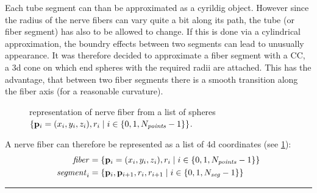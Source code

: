 Each tube segment can than be approximated as a cyrildig object.
However since the radius of the nerve fibers can vary quite a bit along its path, the tube (or fiber segment) has also to be allowed to change.
If this is done via a cylindrical approximation, the boundry effects between two segments can lead to unusually appearance.
It was therefore decided to approximate a fiber segment with a \ac{CC}, a 3d cone on which end spheres with the required radii are attached.
This has the advantage, that between two fiber segments there is a smooth transition along the fiber axis (for a reasonable curvature).
% 
\begin{figure}[!t]
    \def\tikzwidth{0.85\textwidth}
    \centering
	\caption[]{representation of nerve fiber from a list of spheres $\left\{ \mathbf{p}_i=(x_i,y_i,z_i), r_i \mid i \in \{0,1,N_{\mathit{points}}-1\}\right\}$.}
	\label{fig:fiberReb}
\end{figure}
% 
A nerve fiber can therefore be represented as a list of 4d coordinates (see \cref{fig:fiberReb}):
\begin{align}
\begin{split}
\mathit{fiber} &= \left\{ \mathbf{p}_i=(x_i,y_i,z_i), r_i \mid i \in \{0,1,N_{\mathit{points}}-1\}\right\} \\
\mathit{segment}_i &= \left\{ \mathbf{p}_i, \mathbf{p}_{i+1}, r_i, r_{i+1} \mid i \in \{0,1,N_{\mathit{seg}}-1\} \right\}
\end{split}
\end{align}
% 
% 
\vspace{5pt}
\hrule
\vspace{6pt}
% 
\newpage
% 
